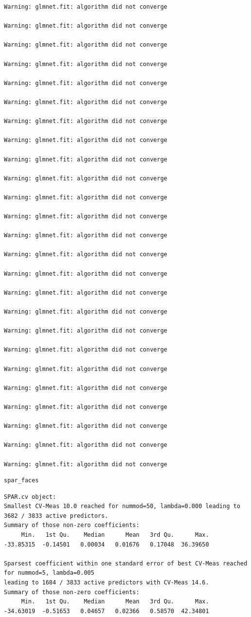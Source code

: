 \documentclass[
  article]{jss}
\begin{document}
\begin{verbatim}
Warning: glmnet.fit: algorithm did not converge

Warning: glmnet.fit: algorithm did not converge

Warning: glmnet.fit: algorithm did not converge

Warning: glmnet.fit: algorithm did not converge

Warning: glmnet.fit: algorithm did not converge

Warning: glmnet.fit: algorithm did not converge

Warning: glmnet.fit: algorithm did not converge

Warning: glmnet.fit: algorithm did not converge

Warning: glmnet.fit: algorithm did not converge

Warning: glmnet.fit: algorithm did not converge

Warning: glmnet.fit: algorithm did not converge

Warning: glmnet.fit: algorithm did not converge

Warning: glmnet.fit: algorithm did not converge

Warning: glmnet.fit: algorithm did not converge

Warning: glmnet.fit: algorithm did not converge

Warning: glmnet.fit: algorithm did not converge

Warning: glmnet.fit: algorithm did not converge

Warning: glmnet.fit: algorithm did not converge

Warning: glmnet.fit: algorithm did not converge

Warning: glmnet.fit: algorithm did not converge

Warning: glmnet.fit: algorithm did not converge

Warning: glmnet.fit: algorithm did not converge

Warning: glmnet.fit: algorithm did not converge

Warning: glmnet.fit: algorithm did not converge

Warning: glmnet.fit: algorithm did not converge
\end{verbatim}

\begin{verbatim}
spar_faces
\end{verbatim}

\begin{verbatim}
SPAR.cv object:
Smallest CV-Meas 10.0 reached for nummod=50, lambda=0.000 leading to 3682 / 3833 active predictors.
Summary of those non-zero coefficients:
     Min.   1st Qu.    Median      Mean   3rd Qu.      Max. 
-33.85315  -0.14501   0.00034   0.01676   0.17048  36.39650 

Sparsest coefficient within one standard error of best CV-Meas reached for nummod=5, lambda=0.005 
leading to 1684 / 3833 active predictors with CV-Meas 14.6.
Summary of those non-zero coefficients:
     Min.   1st Qu.    Median      Mean   3rd Qu.      Max. 
-34.63019  -0.51653   0.04657   0.02366   0.58570  42.34801 
\end{verbatim}
\end{document}
